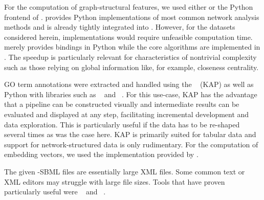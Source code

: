 \documentclass[
	fontsize=10pt, %
	twoside=false, %
	secnumdepth=1, %
  toc=indentunnumbered %
]{kaobook}
\begin{document}
For the computation of graph-structural features, we used either
 \cite{hagberg_ExploringNetworkStructure_2008} or the Python
frontend of  \cite{csardi_IgraphSoftwarePackage_}.
 provides Python implementations of most common network
analysis methods and is already tightly integrated into .
However, for the datasets considered herein,  implementations
would require unfeasible computation time.  merely provides
bindings in Python while the core algorithms are implemented in . The
speedup is particularly relevant for characteristics of nontrivial complexity
such as those relying on global information like, for example, closeness
centrality.

GO term annotations were extracted and handled using the ~\cite{gesellschaftfurklassifikation_DataAnalysisMachine_2008} (KAP)
as well as Python with libraries such as
~\cite{reback_PandasdevPandasPandas_2021} and
~\cite{harris_ArrayProgrammingNumPy_2020}. For this use-case,
KAP has the advantage that a pipeline can be constructed visually and
intermediate results can be evaluated and displayed at any step, facilitating
incremental development and data exploration. This is particularly useful if the
data has to be re-shaped several times as was the case here. KAP is primarily
suited for tabular data and support for network-structured data is only
rudimentary. For the computation of embedding vectors, we used the
 implementation provided by . 

The given -SBML files are essentially large XML files.
Some common text or XML editors may struggle with large file sizes. Tools that
have proven particularly useful were
~\cite{_Xmlexplorer_2021} and ~\cite{_GNUEmacsGNU_}.
\end{document}
